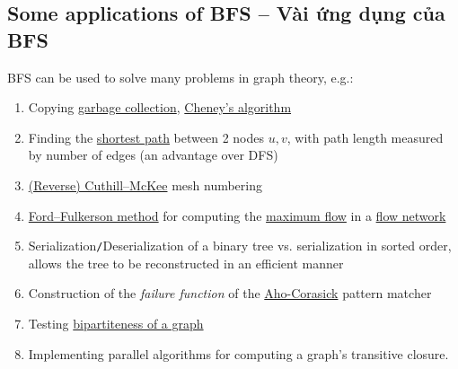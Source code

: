 \documentclass[oneside]{book}
\begin{document}
\subsection{Some applications of BFS -- Vài ứng dụng của BFS}
BFS can be used to solve many problems in graph theory, e.g.:
\begin{enumerate}
	\item Copying \href{https://en.wikipedia.org/wiki/Garbage_collection_(computer_science)}{garbage collection}, \href{https://en.wikipedia.org/wiki/Cheney%27s_algorithm}{Cheney's algorithm}
	\item Finding the \href{https://en.wikipedia.org/wiki/Shortest_path}{shortest path} between 2 nodes $u,v$, with path length measured by number of edges (an advantage over DFS)
	\item \href{https://en.wikipedia.org/wiki/Cuthill%E2%80%93McKee_algorithm}{(Reverse) Cuthill--McKee} mesh numbering
	\item \href{https://en.wikipedia.org/wiki/Ford%E2%80%93Fulkerson_algorithm}{Ford--Fulkerson method} for computing the \href{https://en.wikipedia.org/wiki/Maximum_flow_problem}{maximum flow} in a \href{https://en.wikipedia.org/wiki/Flow_network}{flow network}
	\item Serialization{\tt/}Deserialization of a binary tree vs. serialization in sorted order, allows the tree to be reconstructed in an efficient manner
	\item Construction of the {\it failure function} of the \href{https://en.wikipedia.org/wiki/Aho-Corasick}{Aho-Corasick} pattern matcher
	\item Testing \href{https://en.wikipedia.org/wiki/Bipartite_graph#Testing_bipartiteness}{bipartiteness of a graph}
	\item Implementing parallel algorithms for computing a graph's transitive closure.
\end{enumerate}

\end{document}
